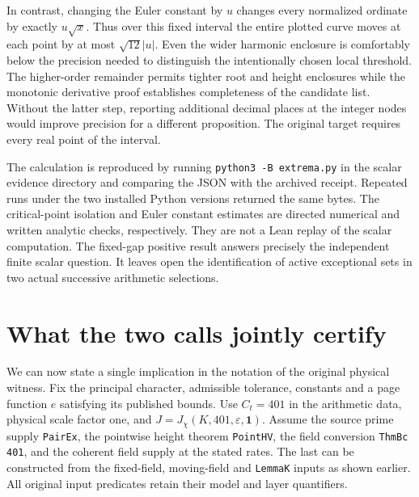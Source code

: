 \documentclass[12pt,letterpaper]{article}
\begin{document}
In contrast, changing the Euler constant by \(u\) changes every normalized ordinate by exactly \(u\sqrt{x}\). Thus over this fixed interval the entire plotted curve moves at each point by at most \(\sqrt{12}|u|\). Even the wider harmonic enclosure is comfortably below the precision needed to distinguish the intentionally chosen local threshold. The higher-order remainder permits tighter root and height enclosures while the monotonic derivative proof establishes completeness of the candidate list. Without the latter step, reporting additional decimal places at the integer nodes would improve precision for a different proposition. The original target requires every real point of the interval.

The calculation is reproduced by running \texttt{python3 -B extrema.py} in the scalar evidence directory and comparing the JSON with the archived receipt. Repeated runs under the two installed Python versions returned the same bytes. The critical-point isolation and Euler constant estimates are directed numerical and written analytic checks, respectively. They are not a Lean replay of the scalar computation. The fixed-gap positive result answers precisely the independent finite scalar question. It leaves open the identification of active exceptional sets in two actual successive arithmetic selections.


\section{What the two calls jointly certify}
\label{sec:conclusion}
We can now state a single implication in the notation of the original physical witness. Fix the principal character, admissible tolerance, constants and a page function \(e\) satisfying its published bounds. Use \(C_t=401\) in the arithmetic data, physical scale factor one, and \(J=J_\chi(K,401,\varepsilon,\mathbf 1)\). Assume the source prime supply \texttt{PairEx}, the pointwise height theorem \texttt{PointHV}, the field conversion \texttt{ThmBc 401}, and the coherent field supply at the stated rates. The last can be constructed from the fixed-field, moving-field and \texttt{LemmaK} inputs as shown earlier. All original input predicates retain their model and layer quantifiers.
\end{document}
